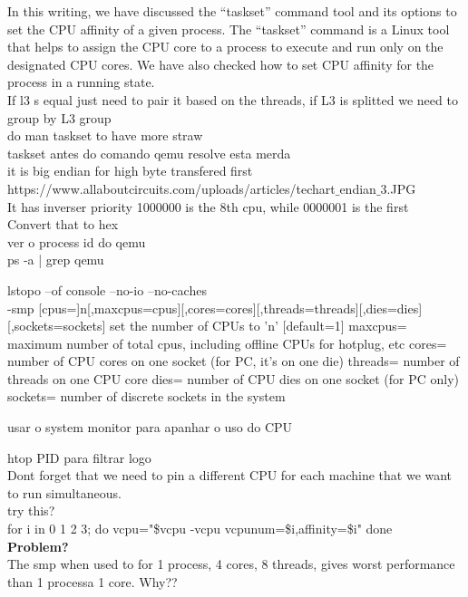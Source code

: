 \documentclass[11pt, a4paper, oneside]{article}
\theoremstyle{definition}
\begin{document}
In this writing, we have discussed the “taskset” command tool and its options to set the CPU affinity of a given process. The “taskset” command is a Linux tool that helps to assign the CPU core to a process to execute and run only on the designated CPU cores. We have also checked how to set CPU affinity for the process in a running state.\\

If l3 s equal just need to pair it based on the threads, if L3 is splitted we need to group by L3 group\\
do man taskset to have more straw\\
taskset antes do comando qemu resolve esta merda\\
it is big endian for high byte transfered first\\
https://www.allaboutcircuits.com/uploads/articles/techart$\_$endian$\_$3.JPG\\
It has inverser priority 1000000 is the 8th cpu, while 0000001 is the first\\
Convert that to hex\\

ver o process id do qemu \\
ps -a | grep qemu

lstopo --of console --no-io --no-caches\\

-smp [cpus=]n[,maxcpus=cpus][,cores=cores][,threads=threads][,dies=dies][,sockets=sockets]
                set the number of CPUs to 'n' [default=1]
                maxcpus= maximum number of total cpus, including
                offline CPUs for hotplug, etc
                cores= number of CPU cores on one socket (for PC, it's on one die)
                threads= number of threads on one CPU core
                dies= number of CPU dies on one socket (for PC only)
                sockets= number of discrete sockets in the system

usar o system monitor para apanhar o uso do CPU

htop PID para filtrar logo \\

Dont forget that we need to pin a different CPU for each machine that we want to run simultaneous.\\

try this?\\
for i in 0 1 2 3; do
    vcpu="\$vcpu -vcpu vcpunum=\$i,affinity=\$i"
done\\

\textbf{Problem?}\\
The smp when used to for 1 process, 4 cores, 8 threads, gives worst performance than 1 processa 1 core. Why??\\
\end{document}
